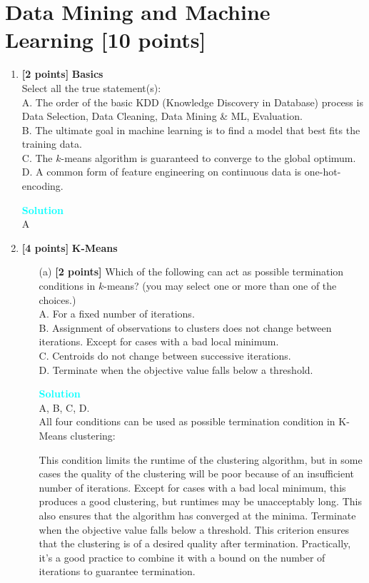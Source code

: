 \documentclass[10pt]{article}
\newenvironment{solution}
    { \begin{mdframed}[backgroundcolor=gray!10] \textcolor{cyan}{\textbf{Solution}} \\}
    {  \end{mdframed}}
\begin{document}
\newpage
\section{Data Mining and Machine Learning \textbf{[10 points]}}

\begin{enumerate}

	\item \textbf{[2 points]} \textbf{Basics} \\
	      Select all the true statement(s): \\
	      A. The order of the basic KDD (Knowledge Discovery in Database) process is Data Selection, Data Cleaning, Data Mining \& ML, Evaluation. \\
	      B. The ultimate goal in machine learning is to find a model that best fits the training data. \\
	      C. The $k$-means algorithm is guaranteed to converge to the global optimum. \\
	      D. A common form of feature engineering on continuous data is one-hot-encoding.
	      \begin{solution}
		      A
	      \end{solution}

	\item \textbf{[4 points]} \textbf{K-Means}
	      \begin{itemize}

		      \item[(a)] \textbf{[2 points]}
		            Which of the following can act as possible termination conditions in $k$-means?
		            (you may select one or more than one of the choices.)\\
		            A. For a fixed number of iterations.\\
		            B. Assignment of observations to clusters does not change between iterations. Except for cases with a bad local minimum.\\
		            C. Centroids do not change between successive iterations.\\
		            D. Terminate when the objective value falls below a threshold.
		            \begin{solution}
			            A, B, C, D.\\
			            All four conditions can be used as possible termination condition in K-Means clustering:

			            This condition limits the runtime of the clustering algorithm, but in some cases the quality of the clustering will be poor because of an insufficient number of iterations.
			            Except for cases with a bad local minimum, this produces a good clustering, but runtimes may be unacceptably long.
			            This also ensures that the algorithm has converged at the minima.
			            Terminate when the objective value falls below a threshold. This criterion ensures that the clustering is of a desired quality after termination.
			            Practically, it’s a good practice to combine it with a bound on the number of iterations to guarantee termination.
		            \end{solution}



\end{itemize}
\end{enumerate}
\end{document}
